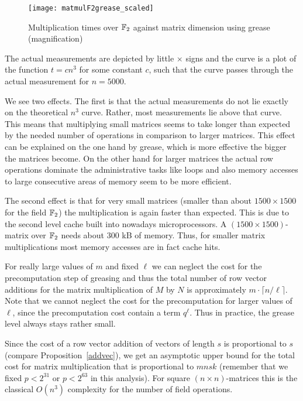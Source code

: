 \begin{figure}[ht]
\begin{center}
\texttt{[image: matmulF2grease\_scaled]}
\end{center}
\caption{Multiplication times over $\mathbb{F}_2$ against matrix dimension
using grease
(magnification)}
\label{matmulgrease_scaled}
%
\end{figure}

The actual measurements are depicted by little $\times$ signs and
the curve is a plot of the function $t = cn^3$ for some constant $c$, such
that the curve passes through the actual measurement for $n=5000$.

We see two effects. The first is that the actual measurements do not lie
exactly on the theoretical $n^3$ curve. Rather, most measurements lie above
that curve. This means that multiplying small matrices seems to take
longer than expected by the needed number of operations in comparison 
to larger matrices. This effect can be explained on the one hand by grease,
which is more effective the bigger the matrices become. On the other hand
for larger matrices the actual row operations dominate the administrative
tasks like loops and also memory accesses to large consecutive areas of
memory seem to be more efficient.

The second effect is that for very small matrices (smaller than about $1500
\times 1500$ for the field $\mathbb{F}_2$) the multiplication is again faster
than expected. This is due to the second level cache built into nowadays
microprocessors. A $(1500\times 1500)$-matrix over $\mathbb{F}_2$ needs about
$300$ kB of memory. Thus, for smaller matrix multiplications most memory
accesses are in fact cache hits.

For really large values of $m$ and fixed $\ell$ we can neglect the cost for the
precomputation step of greasing and thus the total number of row 
vector additions for the matrix multiplication of $M$ by $N$ is
approximately $m \cdot \lceil n/\ell \rceil$. Note that we cannot
neglect the cost for the precomputation for larger values of $\ell$,
since the precomputation cost contain a term $q^\ell$. Thus in practice,
the grease level always stays rather small.

Since the cost of
a row vector addition of vectors of length $s$ is proportional
to $s$ (compare Proposition~\ref{addvec}), we get an asymptotic upper
bound for the total cost for matrix multiplication that is proportional
to $mnsk$ (remember that we fixed $p < 2^{31}$ or $p< 2^{63}$ in this
analysis). For square $(n \times n)$-matrices this is the classical
$O(n^3)$ complexity for the number of field operations.


